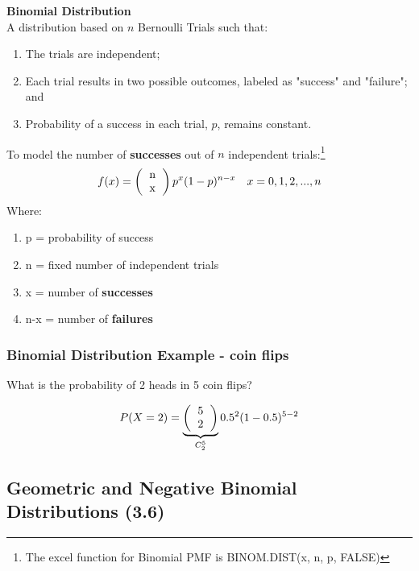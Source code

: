 \documentclass[../INDE315.tex]{subfiles}
\begin{document}
\begin{defn}
    \textbf{Binomial Distribution} \\
    A distribution based on $n$ Bernoulli Trials such that:
    \begin{enumerate}
        \item The trials are independent;
        \item Each trial results in two possible outcomes, labeled as "success" and "failure"; and
        \item Probability of a success in each trial, $p$, remains constant.
    \end{enumerate}
    To model the number of \textbf{successes} out of $n$ independent trials:\footnote{The excel function for Binomial PMF is BINOM.DIST(x, n, p, FALSE)}
    \begin{equation*}
        \begin{aligned}
            f(x) = \left( \begin{tabular}{c}
                n \\
                x
                \end{tabular}  \right) p^x (1 - p)^{n-x} \quad x = 0, 1, 2, ...,n
        \end{aligned}
    \end{equation*}
    Where:
    \begin{enumerate}
        \item p = probability of success
        \item n = fixed number of independent trials
        \item x = number of \textbf{successes}
        \item n-x = number of \textbf{failures}
    \end{enumerate}
\end{defn}

\subsubsection*{Binomial Distribution Example - coin flips}
\begin{exmp}
    What is the probability of 2 heads in 5 coin flips?
\end{exmp}
\begin{equation*}
    \begin{aligned}
        P(X = 2) = \underbrace{\left( \begin{tabular}{c}
            5 \\
            2
            \end{tabular}  \right)}_{C^5_2} 0.5^2 (1 - 0.5)^{5-2}
    \end{aligned}
\end{equation*}


\subsection*{Geometric and Negative Binomial Distributions (3.6)}
\end{document}
